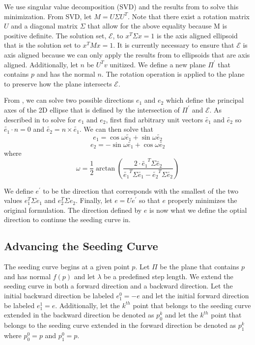 \documentclass{vgtc}                          %
\begin{document}
We use singular value decomposition (SVD) and the results from \cite{Klein2012} to solve this minimization.
From SVD, let $M = U\Sigma U^T$.
Note that there exist a rotation matrix $U$ and a diagonal matrix $\Sigma$ that allow for the above equality because M is positive definite.
The solution set, $\mathcal{E}$, to $x^T\Sigma x = 1$ is the axis aligned ellipsoid that is the solution set to $x^TMx = 1$.
It is currently necessary to ensure that $\mathcal{E}$ is axis aligned because we can only apply the results from \cite{Klein2012} to ellipsoids that are axis aligned.
Additionally, let $n$ be $U^Tv$ unitized.
We define a new plane $\Pi^\prime$ that contains $p$ and has the normal $n$.
The rotation operation is applied to the plane to preserve how the plane intersects $\mathcal{E}$.

From \cite{Klein2012}, we can solve two possible directions $e_1$ and $e_2$ which define the principal axes of the 2D ellipse that is defined by the intersection of $\Pi^\prime$ and $\mathcal{E}$.
As described in \cite{Klein2012} to solve for $e_1$ and $e_2$, first find arbitrary unit vectors $\tilde{e_1}$ and $\tilde{e_2}$ so $\tilde{e_1} \cdot n = 0$ and $\tilde{e_2} = n  \times \tilde{e_1}$.
We can then solve that
\begin{displaymath}
e_1 = \cos \omega \tilde{e_1} + \sin \omega \tilde{e_2}
\end{displaymath}
\begin{displaymath}
e_2 = -\sin \omega \tilde{e_1} + \cos \omega \tilde{e_2}
\end{displaymath}
where
\begin{displaymath}
\omega = \frac{1}{2}\arctan(\frac{2 \cdot \tilde{e_1}^T\Sigma \tilde{e_2}}{\tilde{e_1}^T\Sigma \tilde{e_1} - \tilde{e_2}^T\Sigma \tilde{e_2}})
\end{displaymath}

We define $e^\prime$ to be the direction that corresponds with the smallest of the two values $e_1^T\Sigma e_1$ and $e_2^T\Sigma e_2$.
Finally, let $e = U e^\prime$ so that $e$ properly minimizes the original formulation.
The direction defined by $e$ is now what we define the optial direction to continue the seeding curve in.

\subsection{Advancing the Seeding Curve}

The seeding curve begins at a given point $p$.
Let $\Pi$ be the plane that contains $p$ and has normal $f(p)$ and let $\lambda$ be a predefined step length.
We extend the seeding curve in both a forward direction and a backward direction.
Let the initial backward direction be labeled $e_1^0 = -e$ and let the initial forward direction be labeled $e_1^1 = e$.
Additionally, let the $k^{th}$ point that belongs to the seeding curve extended in the backward direction be denoted as $p_0^k$ and let the $k^{th}$ point that belongs to the seeding curve extended in the forward direction be denoted as $p_1^k$ where $p_0^0 = p$ and  $p_1^0 = p$.
\end{document}
